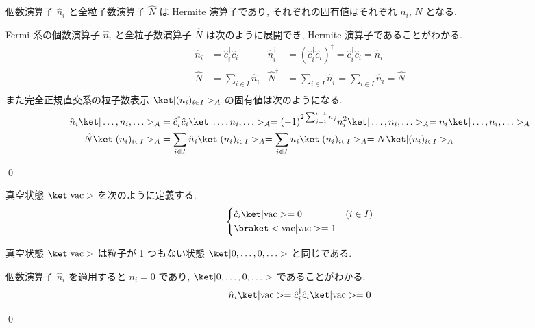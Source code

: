 \documentclass[uplatex,dvipdfmx,a4paper,11pt]{jlreq}
\makeatletter
\numberwithin{equation}{section}
\theoremstyle{definition}
\renewenvironment{proof}[1][\proofname]{\par
  \normalfont
  \topsep6\p@\@plus6\p@ \trivlist
  \item[\hskip\labelsep{\bfseries #1}\@addpunct{\bfseries}]\ignorespaces\quad\par
}{
  \qed\endtrivlist\@endpefalse
}
\renewcommand\proofname{証明}
\makeatother
\begin{document}
\begin{proposition}[Q21-54(i)(ii)(iii)(iv)]
  個数演算子 $\hat{n}_i$ と全粒子数演算子 $\hat{N}$ は Hermite 演算子であり, それぞれの固有値はそれぞれ $n_i$, $N$ となる.
\end{proposition}
\begin{proof}
  Fermi 系の個数演算子 $\hat{n}_i$ と全粒子数演算子 $\hat{N}$ は次のように展開でき, Hermite 演算子であることがわかる.
  \begin{align}
    \hat{n}_i & = \hat{c}_i^\dagger\hat{c}_i & \hat{n}_i^\dagger & = (\hat{c}_i^\dagger\hat{c}_i)^\dagger = \hat{c}_i^\dagger\hat{c}_i = \hat{n}_i \\
    \hat{N}   & = \sum_{i\in I}\hat{n}_i     & \hat{N}^\dagger   & = \sum_{i\in I}\hat{n}_i^\dagger = \sum_{i\in I}\hat{n}_i = \hat{N}             \\
  \end{align}
  また完全正規直交系の粒子数表示 $\ket|(n_i)_{i\in I}>_A$ の固有値は次のようになる.
  \begin{align}
    \hat{n}_i\ket|\ldots,n_i,\ldots>_A & = \hat{c}_i^\dagger\hat{c}_i\ket|\ldots,n_i,\ldots>_A = (-1)^{2\sum_{j=1}^{i-1}n_j}n_i^2\ket|\ldots,n_i,\ldots>_A = n_i\ket|\ldots,n_i,\ldots>_A \\
    \hat{N}\ket|(n_i)_{i\in I}>_A      & = \sum_{i\in I}\hat{n}_i\ket|(n_i)_{i\in I}>_A = \sum_{i\in I}n_i\ket|(n_i)_{i\in I}>_A = N\ket|(n_i)_{i\in I}>_A
  \end{align}
\end{proof}

\begin{definition}
  真空状態 $\ket|\mathrm{vac}>$ を次のように定義する.
  \begin{align}
    \begin{dcases}
      \hat{c}_i\ket|\mathrm{vac}> = 0 & (i\in I) \\
      \braket<\mathrm{vac}|\mathrm{vac}> = 1
    \end{dcases}
  \end{align}
\end{definition}
\begin{proposition}[Q21-55(i)]
  真空状態 $\ket|\mathrm{vac}>$ は粒子が 1 つもない状態 $\ket|0,\ldots,0,\ldots>$ と同じである.
\end{proposition}
\begin{proof}
  個数演算子 $\hat{n}_i$ を適用すると $n_i = 0$ であり, $\ket|0,\ldots,0,\ldots>$ であることがわかる.
  \begin{align}
    \hat{n}_i\ket|\mathrm{vac}> = \hat{c}_i^\dagger\hat{c}_i\ket|\mathrm{vac}> = 0
  \end{align}
\end{proof}
\end{document}
